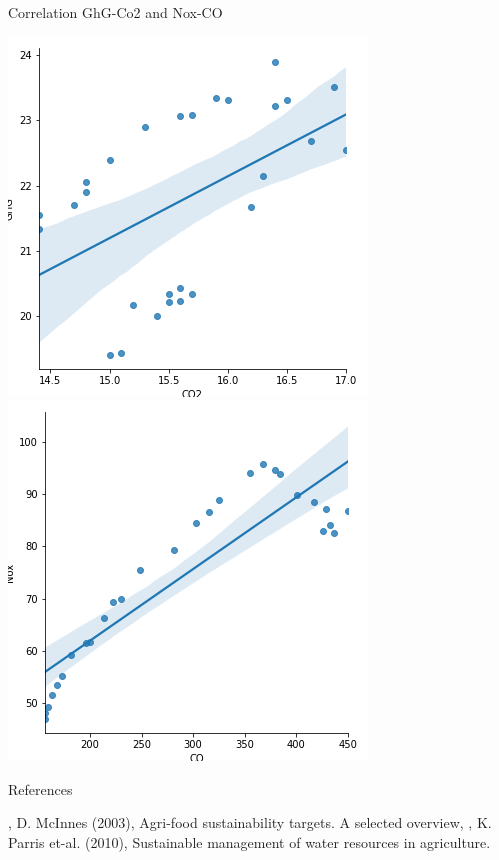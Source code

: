 \documentclass[t,9pt,aspectratio=169]{beamer}
\begin{document}
\begin{frame}{Correlation GhG-Co2 and Nox-CO}
\begin{center}
\includegraphics[scale=0.4 ]{./figures/corr_CO2_GHG} \includegraphics[scale=0.4]{./figures/corr_CO_NOX} 
\end{center}
\end{frame}  

\begin{frame}
{References}
\begin{footnotesize}
\begin{thebibliography}{1}
, D. McInnes (2003), Agri-food sustainability targets. A selected overview, 
,
K. Parris et-al. (2010), Sustainable management of water resources in agriculture. 
\end{thebibliography}
\end{footnotesize}
\vspace{0.5cm}


\end{frame}
\end{document}
